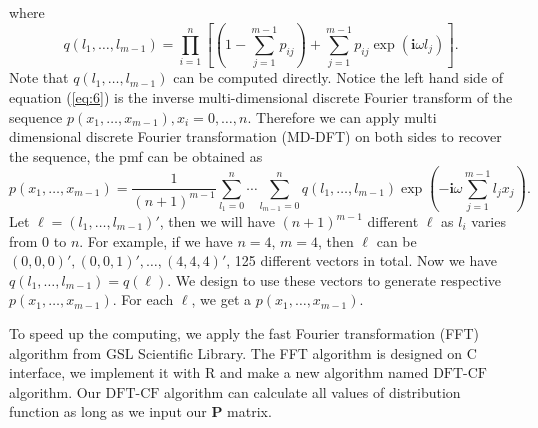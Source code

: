 \documentclass[12pt]{article}
\newcommand{\Pmat}{\mathbf{P}}
\newcommand{\ivec}{{\boldsymbol{i}}}
\newcommand{\dft}{{\textrm{DFT-CF}}}
\begin{document}
where
$$
q(l_1, \ldots, l_{m-1})=\prod_{i=1}^{n}\left[(1 - \sum_{j=1}^{m-1}p_{ij})+\sum_{j=1}^{m-1}p_{ij}\exp(\ivec \omega l_j)\right].
$$	
Note that $q(l_1, \ldots, l_{m-1})$ can be computed directly. Notice the left hand side of equation (\ref{eq:6}) is the inverse multi-dimensional discrete Fourier transform of the sequence $ p(x_1,\ldots,x_{m-1}), x_i = 0 , \dots, n$. Therefore we can apply multi dimensional discrete Fourier transformation (MD-DFT) on both sides to recover the sequence, the pmf can be obtained as
\begin{equation}\label{eq:7}
p(x_1, \ldots, x_{m-1}) = \frac{1}{(n+1)^{m-1}}\sum_{l_1 = 0}^{n}\cdots \sum_{l_{m-1} = 0}^n q(l_1, \ldots, l_{m-1}) \exp\left(-\ivec\omega\sum_{j=1}^{m-1}l_j x_j\right).
\end{equation}
Let $\ell = (l_1,\dots,l_{m-1})'$, then we will have $(n
+1)^{m-1}$ different $\ell$ as $l_i$ varies from $0$ to $n$. For example, if we have $n=4$, $m=4$, then $\ell$ can be $(0, 0, 0)', (0, 0, 1)', \dots, (4, 4, 4)'$, 125 different vectors in total. Now we have $q(l_1,\dots,l_{m-1}) = q(\ell)$. We design to use these vectors to generate respective $p(x_1,\dots,x_{m-1})$. For each $\ell$, we get a $p(x_1,\dots,x_{m-1})$.

To speed up the computing, we apply the fast Fourier transformation (FFT) algorithm  from GSL Scientific Library. The FFT algorithm is designed on C interface, we implement it with R and make a new algorithm named $\dft$ algorithm. Our $\dft$ algorithm can calculate all values of distribution function as long as we input our $\Pmat$ matrix.



\end{document}
